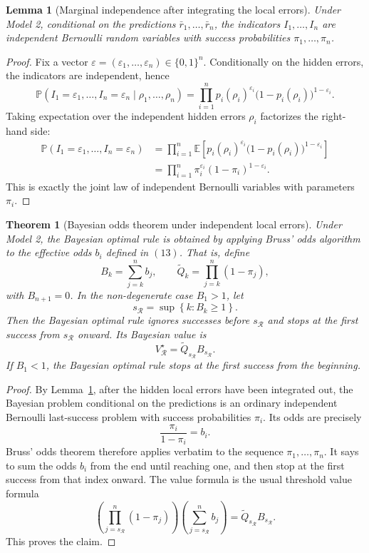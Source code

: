 \documentclass[11pt,a4paper]{article}
\newtheorem{theorem}{Theorem}
\newtheorem{lemma}{Lemma}
\begin{document}
\begin{lemma}[Marginal independence after integrating the local errors]
\label{lem:marginal-independence}
Under Model 2, conditional on the predictions $\bar r_1,
\dots,\bar r_n$, the
indicators $I_1,\dots,I_n$ are independent Bernoulli random variables with
success probabilities $\pi_1,
\dots,\pi_n$.
\end{lemma}

\begin{proof}
Fix a vector $\varepsilon=(\varepsilon_1,
\dots,\varepsilon_n)\in\{0,1\}^n$.
Conditionally on the hidden errors, the indicators are independent, hence
\[
  \mathbb P(I_1=\varepsilon_1,
\dots,I_n=\varepsilon_n\mid \rho_1,
\dots,\rho_n)
  =
  \prod_{i=1}^n
  p_i(\rho_i)^{\varepsilon_i}
  \bigl(1-p_i(\rho_i)\bigr)^{1-\varepsilon_i}.
\]
Taking expectation over the independent hidden errors $\rho_i$ factorizes the
right-hand side:
\begin{align*}
  \mathbb P(I_1=\varepsilon_1,
\dots,I_n=\varepsilon_n)
  &=
  \prod_{i=1}^n
  \mathbb E\left[
    p_i(\rho_i)^{\varepsilon_i}
    \bigl(1-p_i(\rho_i)\bigr)^{1-\varepsilon_i}
  \right] \\
  &=
  \prod_{i=1}^n
  \pi_i^{\varepsilon_i}(1-\pi_i)^{1-\varepsilon_i}.
\end{align*}
This is exactly the joint law of independent Bernoulli variables with parameters
$\pi_i$.
\end{proof}

\begin{theorem}[Bayesian odds theorem under independent local errors]
\label{thm:bayes-bruss}
Under Model 2, the Bayesian optimal rule is obtained by applying Bruss' odds
algorithm to the effective odds $b_i$ defined in \((13)\).  That is, define
\[
  B_k=\sum_{j=k}^n b_j,
  \qquad
  \widetilde Q_k=\prod_{j=k}^n(1-\pi_j),
\]
with $B_{n+1}=0$.  In the non-degenerate case $B_1>1$, let
\[
  s_{\mathcal R}
  =\sup\left\{k:B_k\ge1\right\}.
\]
Then the Bayesian optimal rule ignores successes before $s_{\mathcal R}$ and
stops at the first success from $s_{\mathcal R}$ onward.  Its Bayesian value is
\[
  \boxed{
  V_{\mathcal R}^{\star}
  =\widetilde Q_{s_{\mathcal R}}B_{s_{\mathcal R}}.
  }
  \tag{14}
\]
If $B_1<1$, the Bayesian optimal rule stops at the first success from the
beginning.
\end{theorem}

\begin{proof}
By Lemma~\ref{lem:marginal-independence}, after the hidden local errors have
been integrated out, the Bayesian problem conditional on the predictions is an
ordinary independent Bernoulli last-success problem with success probabilities
$\pi_i$.  Its odds are precisely
\[
  \frac{\pi_i}{1-\pi_i}=b_i.
\]
Bruss' odds theorem therefore applies verbatim to the sequence
$\pi_1,
\dots,\pi_n$.  It says to sum the odds $b_i$ from the end until reaching one,
and then stop at the first success from that index onward.  The value formula is
the usual threshold value formula
\[
  \left(\prod_{j=s_{\mathcal R}}^n(1-\pi_j)\right)
  \left(\sum_{j=s_{\mathcal R}}^n b_j\right)
  =\widetilde Q_{s_{\mathcal R}}B_{s_{\mathcal R}}.
\]
This proves the claim.
\end{proof}
\end{document}
